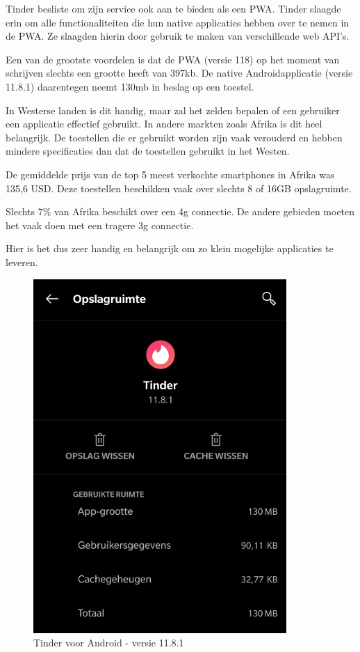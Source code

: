 	Tinder besliste om zijn service ook aan te bieden als een PWA. Tinder slaagde erin om alle functionaliteiten die hun native applicaties hebben over te nemen in de PWA. Ze slaagden hierin door gebruik te maken van verschillende web API’s. 
	\autocite{Osmani2017}
	
	Een van de grootste voordelen is dat de PWA (versie 118) op het moment van schrijven slechts een grootte heeft van 397kb. De native Androidapplicatie (versie 11.8.1) daarentegen neemt 130mb in beslag op een toestel.
	
	In Westerse landen is dit handig, maar zal het zelden bepalen of een gebruiker een applicatie effectief gebruikt. In andere markten zoals Afrika is dit heel belangrijk. De toestellen die er gebruikt worden zijn vaak verouderd en hebben mindere specificaties dan dat de toestellen gebruikt in het Westen. 
	
	De gemiddelde prijs van de top 5 meest verkochte smartphones in Afrika was 135,6 USD. Deze toestellen beschikken vaak over slechts 8 of 16GB opslagruimte. 
	\autocite{netAdmin2017}
	
	Slechts 7\% van Afrika beschikt over een 4g connectie. De andere gebieden moeten het vaak doen met een tragere 3g connectie.	
	\autocite{gsmArena2020}

	
	Hier is het dus zeer handig en belangrijk om zo klein mogelijke applicaties te leveren.
	
	\begin{figure}[H]
		\centering
		\includegraphics{./img/tinder_native.png}
		\caption{Tinder voor Android -  versie 11.8.1}
	\end{figure}
	
